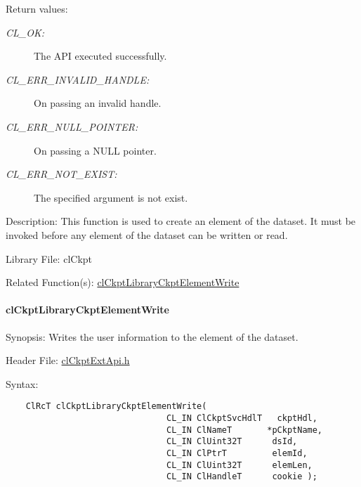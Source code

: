 \begin{Desc}
\item[Return values:]
\begin{description}
\item[{\em CL\_\-OK:}]The API executed successfully. \item[{\em CL\_\-ERR\_\-INVALID\_\-HANDLE:}]On passing an invalid handle. \item[{\em CL\_\-ERR\_\-NULL\_\-POINTER:}]On passing a NULL pointer. \item[{\em CL\_\-ERR\_\-NOT\_\-EXIST:}]The specified argument is not exist.\end{description}
\end{Desc}
\begin{Desc}
\item[Description:]This function is used to create an element of the dataset. It must be invoked before any element of the dataset can be written or read.\end{Desc}
\begin{Desc}
\item[Library File:]cl\-Ckpt\end{Desc}
\begin{Desc}
\item[Related Function(s):]\hyperlink{group__group10}{cl\-Ckpt\-Library\-Ckpt\-Element\-Write} \end{Desc}
\hypertarget{pageckpt212}{}\paragraph{cl\-Ckpt\-Library\-Ckpt\-Element\-Write}\label{pageckpt212}
\begin{Desc}
\item[Synopsis:]Writes the user information to the element of the dataset.\end{Desc}
\begin{Desc}
\item[Header File:]\hyperlink{cl_ckpt_ext_api_8h}{cl\-Ckpt\-Ext\-Api.h}\end{Desc}
\begin{Desc}
\item[Syntax:]

\footnotesize\begin{verbatim}    ClRcT clCkptLibraryCkptElementWrite(
                                CL_IN ClCkptSvcHdlT   ckptHdl,
                                CL_IN ClNameT       *pCkptName,
                                CL_IN ClUint32T      dsId,
                                CL_IN ClPtrT         elemId,
                                CL_IN ClUint32T      elemLen,
                                CL_IN ClHandleT      cookie );
\end{verbatim}
\normalsize
\end{Desc}
